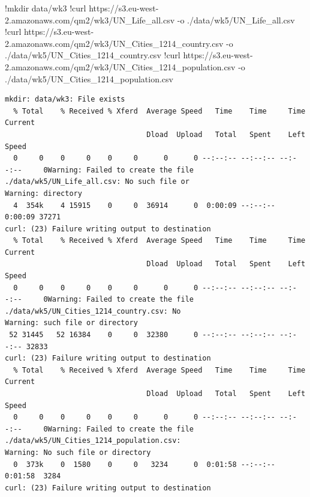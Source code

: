 \documentclass[
  letterpaper,
  DIV=11,
  numbers=noendperiod]{scrreprt}
\newenvironment{Shaded}{\begin{snugshade}}{\end{snugshade}}
\newcommand{\ErrorTok}[1]{\textcolor[rgb]{0.68,0.00,0.00}{#1}}
\newcommand{\FloatTok}[1]{\textcolor[rgb]{0.68,0.00,0.00}{#1}}
\newcommand{\NormalTok}[1]{\textcolor[rgb]{0.00,0.23,0.31}{#1}}
\newcommand{\OperatorTok}[1]{\textcolor[rgb]{0.37,0.37,0.37}{#1}}
\begin{document}
\begin{Shaded}
\begin{Highlighting}[]
\OperatorTok{!}\NormalTok{mkdir data}\OperatorTok{/}\NormalTok{wk3}
\OperatorTok{!}\NormalTok{curl https:}\OperatorTok{//}\NormalTok{s3.eu}\OperatorTok{{-}}\NormalTok{west}\OperatorTok{{-}}\FloatTok{2.}\ErrorTok{amazonaws}\NormalTok{.com}\OperatorTok{/}\NormalTok{qm2}\OperatorTok{/}\NormalTok{wk3}\OperatorTok{/}\NormalTok{UN\_Life\_all.csv }\OperatorTok{{-}}\NormalTok{o .}\OperatorTok{/}\NormalTok{data}\OperatorTok{/}\NormalTok{wk5}\OperatorTok{/}\NormalTok{UN\_Life\_all.csv}
\OperatorTok{!}\NormalTok{curl https:}\OperatorTok{//}\NormalTok{s3.eu}\OperatorTok{{-}}\NormalTok{west}\OperatorTok{{-}}\FloatTok{2.}\ErrorTok{amazonaws}\NormalTok{.com}\OperatorTok{/}\NormalTok{qm2}\OperatorTok{/}\NormalTok{wk3}\OperatorTok{/}\NormalTok{UN\_Cities\_1214\_country.csv }\OperatorTok{{-}}\NormalTok{o .}\OperatorTok{/}\NormalTok{data}\OperatorTok{/}\NormalTok{wk5}\OperatorTok{/}\NormalTok{UN\_Cities\_1214\_country.csv}
\OperatorTok{!}\NormalTok{curl https:}\OperatorTok{//}\NormalTok{s3.eu}\OperatorTok{{-}}\NormalTok{west}\OperatorTok{{-}}\FloatTok{2.}\ErrorTok{amazonaws}\NormalTok{.com}\OperatorTok{/}\NormalTok{qm2}\OperatorTok{/}\NormalTok{wk3}\OperatorTok{/}\NormalTok{UN\_Cities\_1214\_population.csv }\OperatorTok{{-}}\NormalTok{o .}\OperatorTok{/}\NormalTok{data}\OperatorTok{/}\NormalTok{wk5}\OperatorTok{/}\NormalTok{UN\_Cities\_1214\_population.csv}
\end{Highlighting}
\end{Shaded}

\begin{verbatim}
mkdir: data/wk3: File exists
  % Total    % Received % Xferd  Average Speed   Time    Time     Time  Current
                                 Dload  Upload   Total   Spent    Left  Speed
  0     0    0     0    0     0      0      0 --:--:-- --:--:-- --:--:--     0Warning: Failed to create the file ./data/wk5/UN_Life_all.csv: No such file or 
Warning: directory
  4  354k    4 15915    0     0  36914      0  0:00:09 --:--:--  0:00:09 37271
curl: (23) Failure writing output to destination
  % Total    % Received % Xferd  Average Speed   Time    Time     Time  Current
                                 Dload  Upload   Total   Spent    Left  Speed
  0     0    0     0    0     0      0      0 --:--:-- --:--:-- --:--:--     0Warning: Failed to create the file ./data/wk5/UN_Cities_1214_country.csv: No 
Warning: such file or directory
 52 31445   52 16384    0     0  32380      0 --:--:-- --:--:-- --:--:-- 32833
curl: (23) Failure writing output to destination
  % Total    % Received % Xferd  Average Speed   Time    Time     Time  Current
                                 Dload  Upload   Total   Spent    Left  Speed
  0     0    0     0    0     0      0      0 --:--:-- --:--:-- --:--:--     0Warning: Failed to create the file ./data/wk5/UN_Cities_1214_population.csv: 
Warning: No such file or directory
  0  373k    0  1580    0     0   3234      0  0:01:58 --:--:--  0:01:58  3284
curl: (23) Failure writing output to destination
\end{verbatim}
\end{document}
